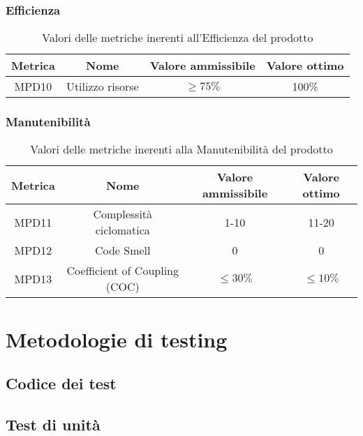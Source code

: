 \documentclass[italian,12pt]{article} %
\begin{document}
\subsubsection{Efficienza}

\begin{table}[h!]
	\centering
	\begin{tabular}{|c|c|c|c|} 
	 \hline
	 Metrica & Nome & Valore ammissibile & Valore ottimo \\  
	 \hline
	 MPD10 & Utilizzo risorse & $\geq 75\% $  & 100\% \\
	 \hline
	\end{tabular}
	\caption{ Valori delle metriche inerenti all'Efficienza del prodotto}
	\label{table:10}
	\end{table}

\subsubsection{Manutenibilità}

\begin{table}[h!]
	\centering
	\begin{tabular}{|c|c|c|c|} 
	 \hline
	 Metrica & Nome & Valore ammissibile & Valore ottimo \\  
	 \hline
	 MPD11 & Complessità ciclomatica & 1-10 & 11-20 \\
	 \hline
	 MPD12 & Code Smell & 0 & 0 \\ 
	 \hline
	 MPD13 & Coefficient of Coupling (COC) & $\leq 30\% $ & $\leq 10\% $ \\ 
	 \hline
	\end{tabular}
	\caption{ Valori delle metriche inerenti alla Manutenibilità del prodotto}
	\label{table:11}
	\end{table}

\section{Metodologie di testing}

\subsection{Codice dei test}

\subsection{Test di unità}
\end{document}
